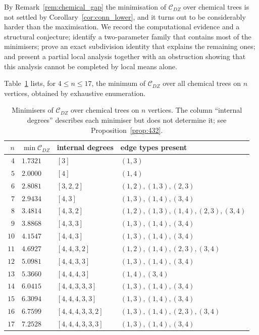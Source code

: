 \documentclass[11pt,a4paper]{article}
\theoremstyle{plain}
\theoremstyle{definition}
\theoremstyle{remark}
\newcommand{\CDZ}{\mathcal{C}_{DZ}}
\begin{document}
By Remark~\ref{rem:chemical_gap} the minimisation of $\CDZ$ over chemical trees
is not settled by Corollary~\ref{cor:conn_lower}, and it turns out to be
considerably harder than the maximisation. We record the computational evidence
and a structural conjecture; identify a two-parameter family that contains most
of the minimisers; prove an exact subdivision identity that explains the
remaining ones; and present a partial local analysis together with an
obstruction showing that this analysis cannot be completed by local means
alone.

Table~\ref{tab:minimisers} lists, for $4\le n\le17$, the minimum of $\CDZ$ over
all chemical trees on $n$ vertices, obtained by exhaustive enumeration.

\begin{table}[htbp]
\centering
\caption{Minimisers of $\CDZ$ over chemical trees on $n$ vertices. The column
``internal degrees'' describes each minimiser but does not determine it; see
Proposition~\ref{prop:432}.}
\label{tab:minimisers}
\begin{tabular}{rlll}
\toprule
$n$ & $\min\CDZ$ & internal degrees & edge types present \\
\midrule
$4$  & $1.7321$ & $[3]$           & $(1,3)$ \\
$5$  & $2.0000$ & $[4]$           & $(1,4)$ \\
$6$  & $2.8081$ & $[3,2,2]$       & $(1,2),(1,3),(2,3)$ \\
$7$  & $2.9434$ & $[4,3]$         & $(1,3),(1,4),(3,4)$ \\
$8$  & $3.4814$ & $[4,3,2]$       & $(1,2),(1,3),(1,4),(2,3),(3,4)$ \\
$9$  & $3.8868$ & $[4,3,3]$       & $(1,3),(1,4),(3,4)$ \\
$10$ & $4.1547$ & $[4,4,3]$       & $(1,3),(1,4),(3,4)$ \\
$11$ & $4.6927$ & $[4,4,3,2]$     & $(1,2),(1,4),(2,3),(3,4)$ \\
$12$ & $5.0981$ & $[4,4,3,3]$     & $(1,3),(1,4),(3,4)$ \\
$13$ & $5.3660$ & $[4,4,4,3]$     & $(1,4),(3,4)$ \\
$14$ & $6.0415$ & $[4,4,3,3,3]$   & $(1,3),(1,4),(3,4)$ \\
$15$ & $6.3094$ & $[4,4,4,3,3]$   & $(1,3),(1,4),(3,4)$ \\
$16$ & $6.7599$ & $[4,4,4,3,3,2]$ & $(1,3),(1,4),(2,3),(3,4)$ \\
$17$ & $7.2528$ & $[4,4,4,3,3,3]$ & $(1,3),(1,4),(3,4)$ \\
\bottomrule
\end{tabular}
\end{table}
\end{document}
